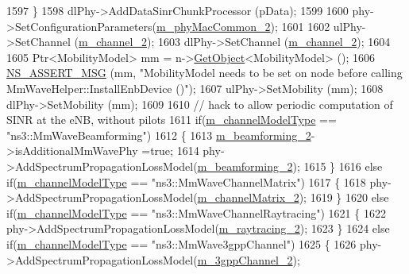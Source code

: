 \begin{DoxyCode}
1597         \}
1598         dlPhy->AddDataSinrChunkProcessor (pData);
1599 
1600         phy->SetConfigurationParameters(\hyperlink{classns3_1_1MmWaveHelper_ab4e9d2f9a49a485dadb3404e8c196f4c}{m\_phyMacCommon\_2});
1601 
1602         ulPhy->SetChannel (\hyperlink{classns3_1_1MmWaveHelper_af0230ef91f1c4defe2a316f5de3ff209}{m\_channel\_2});
1603         dlPhy->SetChannel (\hyperlink{classns3_1_1MmWaveHelper_af0230ef91f1c4defe2a316f5de3ff209}{m\_channel\_2});
1604 
1605         Ptr<MobilityModel> mm = n->\hyperlink{classns3_1_1Object_a13e18c00017096c8381eb651d5bd0783}{GetObject}<MobilityModel> ();
1606         \hyperlink{assert_8h_aff5ece9066c74e681e74999856f08539}{NS\_ASSERT\_MSG} (mm, \textcolor{stringliteral}{"MobilityModel needs to be set on node before calling
       MmWaveHelper::InstallEnbDevice ()"});
1607         ulPhy->SetMobility (mm);
1608         dlPhy->SetMobility (mm);
1609 
1610         \textcolor{comment}{// hack to allow periodic computation of SINR at the eNB, without pilots}
1611         \textcolor{keywordflow}{if}(\hyperlink{classns3_1_1MmWaveHelper_aec88d691230f0db9448a7f953301bb24}{m\_channelModelType} == \textcolor{stringliteral}{"ns3::MmWaveBeamforming"})
1612         \{
1613                 \hyperlink{classns3_1_1MmWaveHelper_a3406a28781481686589a5275787bf43f}{m\_beamforming\_2}->isAdditionalMmWavePhy =\textcolor{keyword}{true};
1614                 phy->AddSpectrumPropagationLossModel(\hyperlink{classns3_1_1MmWaveHelper_a3406a28781481686589a5275787bf43f}{m\_beamforming\_2});
1615         \}
1616         \textcolor{keywordflow}{else} \textcolor{keywordflow}{if}(\hyperlink{classns3_1_1MmWaveHelper_aec88d691230f0db9448a7f953301bb24}{m\_channelModelType} == \textcolor{stringliteral}{"ns3::MmWaveChannelMatrix"})
1617         \{
1618                 phy->AddSpectrumPropagationLossModel(\hyperlink{classns3_1_1MmWaveHelper_af2907a9f5719984dfef74e3736e35bc5}{m\_channelMatrix\_2});
1619         \}
1620         \textcolor{keywordflow}{else} \textcolor{keywordflow}{if}(\hyperlink{classns3_1_1MmWaveHelper_aec88d691230f0db9448a7f953301bb24}{m\_channelModelType} == \textcolor{stringliteral}{"ns3::MmWaveChannelRaytracing"})
1621         \{
1622                 phy->AddSpectrumPropagationLossModel(\hyperlink{classns3_1_1MmWaveHelper_a4fcc697a0b40deaa9bd75ead1c4297d9}{m\_raytracing\_2});
1623         \}
1624         \textcolor{keywordflow}{else} \textcolor{keywordflow}{if}(\hyperlink{classns3_1_1MmWaveHelper_aec88d691230f0db9448a7f953301bb24}{m\_channelModelType} == \textcolor{stringliteral}{"ns3::MmWave3gppChannel"})
1625         \{
1626                 phy->AddSpectrumPropagationLossModel(\hyperlink{classns3_1_1MmWaveHelper_a708ff94e1399ab339e634dc7d4a5b44d}{m\_3gppChannel\_2});

\end{DoxyCode}
